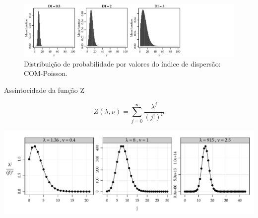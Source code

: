 \documentclass[10pt, aspectratio=169]{beamer}\usepackage[]{graphicx}\usepackage[]{color}
\newenvironment{knitrout}{}{} %
\begin{document}
\begin{frame}[fragile]
\begin{figure}[h]
\includegraphics[scale=0.8]{images/COMPoisson.png}
\caption{Distribuição de probabilidade por valores do
índice de dispersão: COM-Poisson.}
\label{Fig3}
\centering
\end{figure}
\end{frame}

\begin{frame}{Assintocidade da função Z}

$$ Z(\lambda, \nu) = \sum_{j=0}^\infty \frac{\lambda^j}{(j!)^\nu} $$

\begin{knitrout}
\color{fgcolor}

{\centering \includegraphics[width=1\textwidth]{figure/unnamed-chunk-7-1} 

}



\end{knitrout}
\end{frame}
\end{document}
